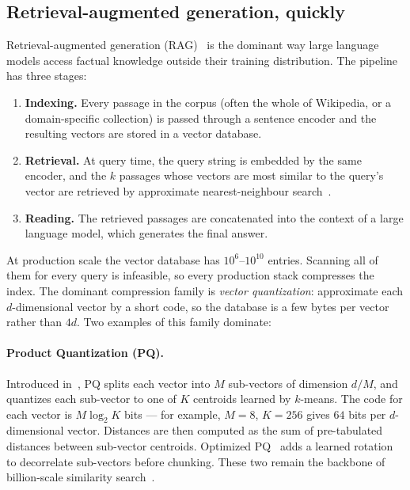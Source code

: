 \subsection{Retrieval-augmented generation, quickly}
\label{sec:background:rag}

Retrieval-augmented generation
(RAG)~\cite{lewisRAG2020,guu2020realm,karpukhin2020dpr,izacardAtlas2023,
borgeaud2022retro,izacard2021fid} is the dominant way large language
models access factual knowledge outside their training distribution. The
pipeline has three stages:

\begin{enumerate}[leftmargin=1.8em, itemsep=2pt]
\item \textbf{Indexing.} Every passage in the corpus (often the whole of
Wikipedia, or a domain-specific collection) is passed through a
sentence encoder and the resulting vectors are stored in a
vector database.
\item \textbf{Retrieval.} At query time, the query string is embedded
by the same encoder, and the $k$ passages whose vectors are most
similar to the query's vector are retrieved by approximate
nearest-neighbour search~\cite{johnson2019faiss,malkovHNSW2018}.
\item \textbf{Reading.} The retrieved passages are concatenated into
the context of a large language model, which generates the final
answer.
\end{enumerate}

At production scale the vector database has $10^{6}$--$10^{10}$
entries. Scanning all of them for every query is infeasible, so every
production stack compresses the index. The dominant compression family
is \emph{vector quantization}: approximate each $d$-dimensional vector
by a short code, so the database is a few bytes per vector rather than
$4d$. Two examples of this family dominate:

\paragraph{Product Quantization (PQ).} Introduced
in~\cite{jegouPQ2011}, PQ splits each vector into $M$ sub-vectors of
dimension $d/M$, and quantizes each sub-vector to one of $K$ centroids
learned by $k$-means. The code for each vector is $M \log_2 K$ bits ---
for example, $M=8$, $K=256$ gives $64$ bits per $d$-dimensional vector.
Distances are then computed as the sum of pre-tabulated distances
between sub-vector centroids. Optimized
PQ~\cite{ge2013optimized} adds a learned rotation to decorrelate
sub-vectors before chunking. These two remain the backbone of
billion-scale similarity search~\cite{johnson2019faiss}.


